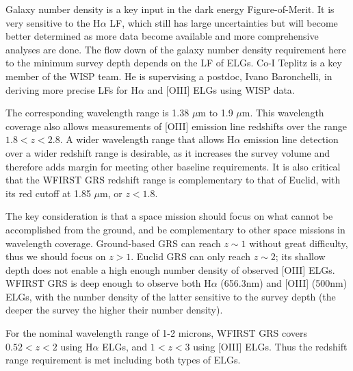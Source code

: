  Galaxy number density is a key input in the dark energy Figure-of-Merit. It
 is very sensitive to the H$\alpha$ LF, which still has large uncertainties but will
 become better determined as more data become available and more comprehensive
 analyses are done. The flow down of the galaxy number density requirement here
 to the minimum survey depth depends on the LF of ELGs.
 Co-I Teplitz is a key member of the WISP team. He is supervising a postdoc, Ivano Baronchelli,
 in deriving more precise LFs for H$\alpha$ and [OIII] ELGs using WISP data.


 The corresponding wavelength range is 1.38 $\mu$m to 1.9 $\mu$m.  This wavelength
 coverage also allows measurements of [OIII] emission line redshifts over the
 range $1.8 < z < 2.8$.  A wider wavelength range that allows H$\alpha$ emission line
 detection over a wider redshift range is desirable, as it increases the survey
 volume and therefore adds margin for meeting other baseline requirements.  It is
 also critical that the WFIRST GRS redshift range is complementary to that of
 Euclid, with its red cutoff at 1.85 $\mu$m, or $z < 1.8$.

 The key consideration is that a space mission should focus on what cannot be
 accomplished from the ground, and be complementary to other space missions in
 wavelength coverage. Ground-based GRS can reach $z\sim1$ without great difficulty,
 thus we should focus on $z>1$. Euclid GRS can only reach $z \sim2$; its shallow depth
 does not enable a high enough number density of observed [OIII] ELGs. WFIRST GRS
 is deep enough to observe both H$\alpha$ (656.3nm) and [OIII] (500nm) ELGs, with the
 number density of the latter sensitive to the survey depth (the deeper the
 survey the higher their number density).

 For the nominal wavelength range of 1-2 microns, WFIRST GRS covers $0.52 < z <
 2$ using H$\alpha$ ELGs, and $1 < z < 3$ using [OIII] ELGs. Thus the redshift range
 requirement is met including both types of ELGs.

